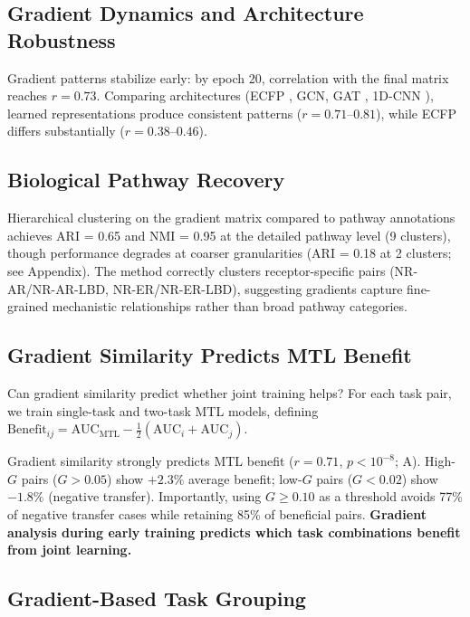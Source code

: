 \documentclass[sigconf,nonacm]{acmart}
\begin{document}
\subsection{Gradient Dynamics and Architecture Robustness}
\label{sec:robustness}

Gradient patterns stabilize early: by epoch 20, correlation with the final matrix reaches $r = 0.73$. Comparing architectures (ECFP \cite{rogers2010ecfp}, GCN, GAT \cite{velickovic2018gat}, 1D-CNN \cite{weininger1988smiles}), learned representations produce consistent patterns ($r = 0.71$--$0.81$), while ECFP differs substantially ($r = 0.38$--$0.46$).

\subsection{Biological Pathway Recovery}

Hierarchical clustering on the gradient matrix compared to pathway annotations achieves ARI = 0.65 and NMI = 0.95 at the detailed pathway level (9 clusters), though performance degrades at coarser granularities (ARI = 0.18 at 2 clusters; see Appendix). The method correctly clusters receptor-specific pairs (NR-AR/NR-AR-LBD, NR-ER/NR-ER-LBD), suggesting gradients capture fine-grained mechanistic relationships rather than broad pathway categories.

\subsection{Gradient Similarity Predicts MTL Benefit}

Can gradient similarity predict whether joint training helps? For each task pair, we train single-task and two-task MTL models, defining $\text{Benefit}_{ij} = \text{AUC}_{\text{MTL}} - \frac{1}{2}(\text{AUC}_i + \text{AUC}_j)$.

Gradient similarity strongly predicts MTL benefit ($r = 0.71$, $p < 10^{-8}$; A). High-$G$ pairs ($G > 0.05$) show $+2.3\%$ average benefit; low-$G$ pairs ($G < 0.02$) show $-1.8\%$ (negative transfer). Importantly, using $G \geq 0.10$ as a threshold avoids 77\% of negative transfer cases while retaining 85\% of beneficial pairs. \textbf{Gradient analysis during early training predicts which task combinations benefit from joint learning.}

\subsection{Gradient-Based Task Grouping}
\end{document}

